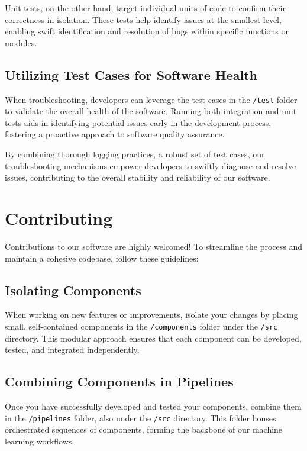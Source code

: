 \documentclass{report}
\begin{document}
Unit tests, on the other hand, target individual units of code to confirm their correctness in isolation. These tests help identify issues at the smallest level, enabling swift identification and resolution of bugs within specific functions or modules.

\section{Utilizing Test Cases for Software Health}

When troubleshooting, developers can leverage the test cases in the \texttt{/test} folder to validate the overall health of the software. Running both integration and unit tests aids in identifying potential issues early in the development process, fostering a proactive approach to software quality assurance.

By combining thorough logging practices, a robust set of test cases, our troubleshooting mechanisms empower developers to swiftly diagnose and resolve issues, contributing to the overall stability and reliability of our software.


\chapter{Contributing}

Contributions to our software are highly welcomed! To streamline the process and maintain a cohesive codebase, follow these guidelines:

\section{Isolating Components}

When working on new features or improvements, isolate your changes by placing small, self-contained components in the \texttt{/components} folder under the \texttt{/src} directory. This modular approach ensures that each component can be developed, tested, and integrated independently.

\section{Combining Components in Pipelines}

Once you have successfully developed and tested your components, combine them in the \texttt{/pipelines} folder, also under the \texttt{/src} directory. This folder houses orchestrated sequences of components, forming the backbone of our machine learning workflows.
\end{document}
